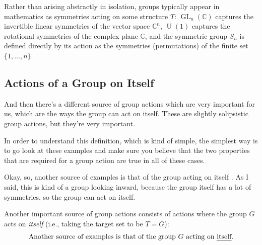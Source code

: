 \begin{insight}
Rather than arising abstractly in isolation, groups typically appear in mathematics as symmetries acting on some structure $T$: $\operatorname{GL}_n(\mathbb{C})$ captures the invertible linear symmetries of the vector space $\mathbb{C}^n$, $\operatorname{U}(1)$ captures the rotational symmetries of the complex plane $\mathbb{C}$, and the symmetric group $S_n$ is defined directly by its action as the symmetries (permutations) of the finite set $\{1, \dots, n\}$.
\end{insight}

\subsection{Actions of a Group on Itself}

\begin{speech}[01:02:18 - 01:03:34]
And then there's a different source of group actions which are very important for us, which are the ways the group can act on itself. These are slightly solipsistic group actions, but they're very important. 

In order to understand this definition, which is kind of simple, the simplest way is to go look at these examples and make sure you believe that the two properties that are required for a group action are true in all of these cases.

Okay, so, another source of examples is that of the group acting on itself . As I said, this is kind of a group looking inward, because the group itself has a lot of symmetries, so the group can act on itself.
\end{speech}

\begin{content}
Another important source of group actions consists of actions where the group $G$ acts on \emph{itself} (i.e., taking the target set to be $T = G$):
\[
\text{Another source of examples is that of the group } G \text{ acting on \emph{itself}.}
\]
\end{content}


